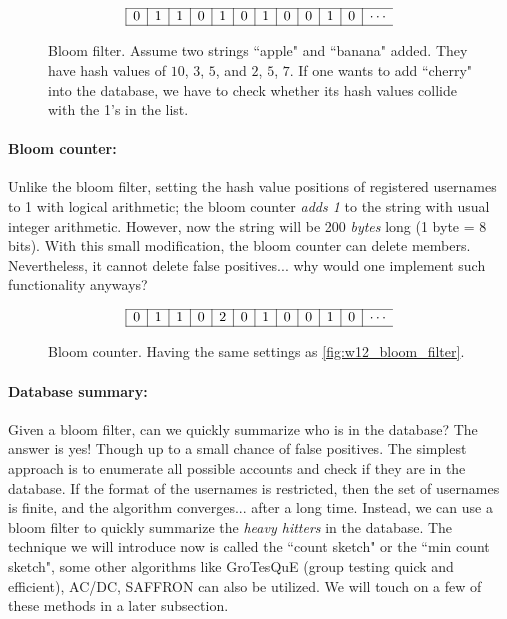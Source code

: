 \begin{figure}[H]
    \centering
    \begin{equation*}\begin{array}{|c|c|c|c|c|c|c|c|c|c|c|c}
        \hline
        0 & 1 & 1 & 0 & 1 & 0 & 1 & 0 & 0 & 1 & 0 & \cdots \\
        \hline
    \end{array}\end{equation*}
    \caption{Bloom filter. Assume two strings ``apple" and ``banana" added. They have hash values of $10$, $3$, $5$, and $2$, $5$, $7$. If one wants to add ``cherry" into the database, we have to check whether its hash values collide with the 1's in the list.}
    \label{fig:w12_bloom_filter}
\end{figure}

\paragraph{Bloom counter:} Unlike the bloom filter, setting the hash value positions of registered usernames to 1 with logical arithmetic; the bloom counter \textit{adds 1} to the string with usual integer arithmetic. However, now the string will be 200 \textit{bytes} long (1 byte = 8 bits). With this small modification, the bloom counter can delete members. Nevertheless, it cannot delete false positives... why would one implement such functionality anyways?

\begin{figure}[H]
    \centering
    \begin{equation*}\begin{array}{|c|c|c|c|c|c|c|c|c|c|c|c}
        \hline
        0 & 1 & 1 & 0 & 2 & 0 & 1 & 0 & 0 & 1 & 0 & \cdots \\
        \hline
    \end{array}\end{equation*}
    \caption{Bloom counter. Having the same settings as \autoref{fig:w12_bloom_filter}.}
    \label{fig:w12_bloom_counter}
\end{figure}

\paragraph{Database summary:} Given a bloom filter, can we quickly summarize who is in the database? The answer is yes! Though up to a small chance of false positives. The simplest approach is to enumerate all possible accounts and check if they are in the database. If the format of the usernames is restricted, then the set of usernames is finite, and the algorithm converges... after a long time. Instead, we can use a bloom filter to quickly summarize the \textit{heavy hitters} in the database. The technique we will introduce now is called the ``count sketch" or the ``min count sketch", some other algorithms like GroTesQuE (group testing quick and efficient), AC/DC, SAFFRON can also be utilized. We will touch on a few of these methods in a later subsection.

